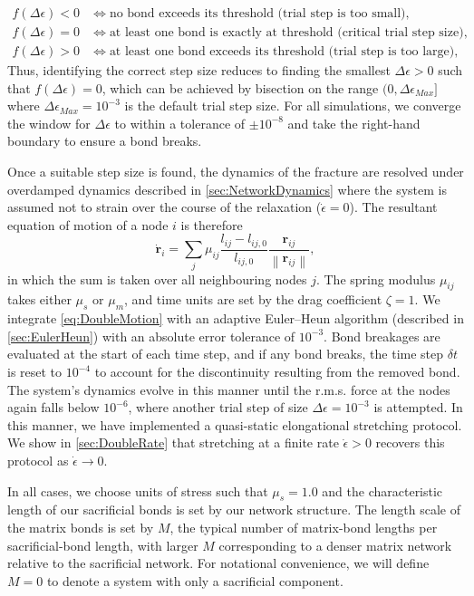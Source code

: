 \begin{align*}
    f(\Delta\epsilon) < 0 &\iff \text{no bond exceeds its threshold (trial step is too small)}, \\
    f(\Delta\epsilon) = 0 &\iff \text{at least one bond is exactly at threshold (critical trial step size)}, \\
    f(\Delta\epsilon) > 0 &\iff \text{at least one bond exceeds its threshold (trial step is too large)},
\end{align*}
Thus, identifying the correct step size reduces to finding the smallest $\Delta\epsilon >0$ such that $f(\Delta\epsilon) = 0$, which can be achieved by bisection on the range $(0,\Delta\epsilon_{Max}]$ where $\Delta\epsilon_{Max}=10^{-3}$ is the default trial step size. For all simulations, we converge the window for $\Delta\epsilon$ to within a tolerance of $\pm 10^{-8}$ and take the right-hand boundary to ensure a bond breaks.  

Once a suitable step size is found, the dynamics of the fracture are resolved under overdamped dynamics described in \cref{sec:NetworkDynamics} where the system is assumed not to strain over the course of the relaxation ($\dot{\epsilon}=0$). The resultant equation of motion of a node $i$ is therefore 
\begin{equation}
    \dot{\bm{r}}_i = \sum_{j}\mu_{ij} \frac{l_{ij}-l_{ij,0}}{l_{ij,0}}\frac{\bm{r}_{ij}}{\left\lVert \bm{r}_{ij} \right\rVert},
    \label{eq:DoubleMotion}
\end{equation}
in which the sum is taken over all neighbouring nodes $j$. The spring modulus $\mu_{ij}$ takes either $\mu_s$ or $\mu_m$, and time units are set by the drag coefficient $\zeta=1$. We integrate \cref{eq:DoubleMotion} with an adaptive Euler--Heun algorithm (described in \cref{sec:EulerHeun}) with an absolute error tolerance of $10^{-3}$. Bond breakages are evaluated at the start of each time step, and if any bond breaks, the time step $\delta t$ is reset to $10^{-4}$ to account for the discontinuity resulting from the removed bond. The system's dynamics evolve in this manner until the r.m.s. force at the nodes again falls below $10^{-6}$, where another trial step of size $\Delta\epsilon=10^{-3}$ is attempted. In this manner, we have implemented a quasi-static elongational stretching protocol. We show in \cref{sec:DoubleRate} that stretching at a finite rate $\dot{\epsilon} > 0$ recovers this protocol as $\dot{\epsilon} \to 0$.

In all cases, we choose units of stress such that $\mu_s = 1.0$ and the characteristic length of our sacrificial bonds is set by our network structure. The length scale of the matrix bonds is set by $M$, the typical number of matrix-bond lengths per sacrificial-bond length, with larger $M$ corresponding to a denser matrix network relative to the sacrificial network. For notational convenience, we will define $M=0$ to denote a system with only a sacrificial component.

